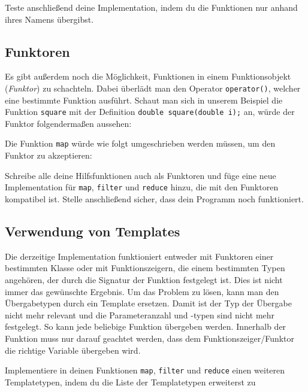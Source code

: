 Teste anschließend deine Implementation, indem du die Funktionen nur anhand ihres Namens übergibst.

\subsection{Funktoren}
\label{sec:functional_functor}
Es gibt außerdem noch die Möglichkeit, Funktionen in einem Funktionsobjekt (\emph{Funktor}) zu schachteln.
Dabei überlädt man den Operator \lstinline{operator()}, welcher eine bestimmte Funktion ausführt. 
Schaut man sich in unserem Beispiel die Funktion \lstinline{square} mit der Definition \lstinline{double square(double i);} an, würde der Funktor folgendermaßen aussehen:



Die Funktion \lstinline{map} würde wie folgt umgeschrieben werden müssen, um den Funktor zu akzeptieren:



Schreibe alle deine Hilfsfunktionen auch als Funktoren und füge eine neue Implementation für \lstinline{map}, \lstinline{filter} und \lstinline{reduce} hinzu, die mit den Funktoren kompatibel ist.
Stelle anschließend sicher, dass dein Programm noch funktioniert.

\subsection{Verwendung von Templates}
\label{sec:functional_template}
Die derzeitige Implementation funktioniert entweder mit Funktoren einer bestimmten Klasse oder mit Funktionszeigern, die einem bestimmten Typen angehören, der durch die Signatur der Funktion festgelegt ist.
Dies ist nicht immer das gewünschte Ergebnis.
Um das Problem zu lösen, kann man den Übergabetypen durch ein Template ersetzen.
Damit ist der Typ der Übergabe nicht mehr relevant und die Parameteranzahl und -typen sind nicht mehr festgelegt. So kann jede beliebige Funktion übergeben werden.
Innerhalb der Funktion muss nur darauf geachtet werden, dass dem Funktionszeiger/Funktor die richtige Variable übergeben wird.

Implementiere in deinen Funktionen \lstinline{map}, \lstinline{filter} und \lstinline{reduce} einen weiteren Templatetypen, indem du die Liste der Templatetypen erweiterst zu 



